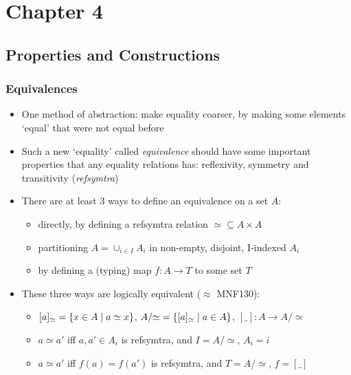\documentclass[handout]{beamer}
\title[INF223 presentations]{}
\begin{document}
\section{Chapter 4}
\subsection{Properties and Constructions}
 
\frame
  {   
    \frametitle{Equivalences}\label{Ch4:Eqvs}

 \begin{itemize}[<+->]
\item One method of abstraction: make equality coarser, by making
some elements `equal' that were not equal before
\item Such a new `equality' called \emph{equivalence} should have some important 
properties that any equality relations has: reflexivity, symmetry and transitivity 
(\emph{refsymtra})
\item There are at least 3 ways to define an equivalence on a set $A$:
   \begin{itemize}[<+->]
\item directly, by defining a refsymtra relation ${\simeq}\subseteq A\times A$
\item partitioning $A = \cup_{i\in I} A_i $ in non-empty, disjoint, I-indexed $A_i$
\item by defining a (typing) map $f: A\to T$ to some set $T$
   \end{itemize}
\item These three ways are logically equivalent ($\approx$ MNF130): 
   \begin{itemize}[<+->]
\item $[a]_\simeq = \{x\in A\mid a\simeq x\}$, 
$A/{\simeq}=\{[a]_\simeq \mid a\in A\}$, $[\_] : A \to A/{\simeq}$
\item $a\simeq a' $ iff $a,a' \in A_i$ is refsymtra, and $I = A/{\simeq}$, $A_i = i$
\item $a\simeq a' $ iff $f(a)=f(a')$ is refsymtra, and  $T = A/{\simeq}$, $f=[\_]$
   \end{itemize}
 \end{itemize}

 }
\end{document}
